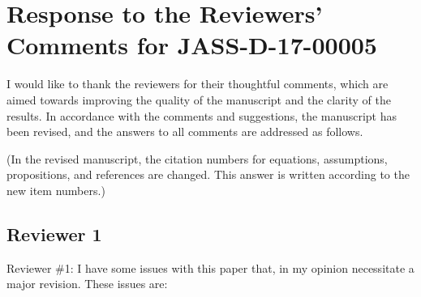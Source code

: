 \documentclass[11pt]{article}
\begin{document}

\section*{Response to the Reviewers' Comments for JASS-D-17-00005}

I would like to thank the reviewers for their thoughtful comments, which are aimed towards improving the quality of the manuscript and the clarity of the results. 
In accordance with the comments and suggestions, the manuscript has been revised, and the answers to all comments are addressed as follows.

(In the revised manuscript, the citation numbers for equations, assumptions, propositions, and references are changed. This answer is written according to the new item numbers.)

\subsection*{Reviewer 1} 
\begin{itshape}
Reviewer \#1: I have some issues with this paper that, in my opinion necessitate a major revision.
These issues are:
\end{itshape}
\end{document}
